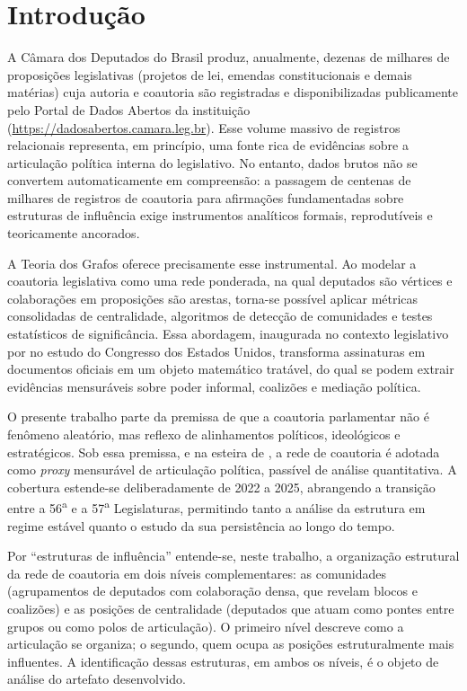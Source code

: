 \documentclass[
      12pt,
      a4paper,
      openright,
      oneside,
      chapter=TITLE,
      section=TITLE,
      english,
      french,
      spanish,
      brazilian
    ]{abntex2}
\begin{document}
    \chapter{Introdução}
    \label{cap:introducao}
    
    A Câmara dos Deputados do Brasil produz, anualmente, dezenas de milhares de proposições legislativas (projetos de lei, emendas constitucionais e demais matérias) cuja autoria e coautoria são registradas e disponibilizadas publicamente pelo Portal de Dados Abertos da instituição (\url{https://dadosabertos.camara.leg.br}). Esse volume massivo de registros relacionais representa, em princípio, uma fonte rica de evidências sobre a articulação política interna do legislativo. No entanto, dados brutos não se convertem automaticamente em compreensão: a passagem de centenas de milhares de registros de coautoria para afirmações fundamentadas sobre estruturas de influência exige instrumentos analíticos formais, reprodutíveis e teoricamente ancorados.
    
    A Teoria dos Grafos oferece precisamente esse instrumental. Ao modelar a coautoria legislativa como uma rede ponderada, na qual deputados são vértices e colaborações em proposições são arestas, torna-se possível aplicar métricas consolidadas de centralidade, algoritmos de detecção de comunidades e testes estatísticos de significância. Essa abordagem, inaugurada no contexto legislativo por  no estudo do Congresso dos Estados Unidos, transforma assinaturas em documentos oficiais em um objeto matemático tratável, do qual se podem extrair evidências mensuráveis sobre poder informal, coalizões e mediação política.
    
    O presente trabalho parte da premissa de que a coautoria parlamentar não é fenômeno aleatório, mas reflexo de alinhamentos políticos, ideológicos e estratégicos. Sob essa premissa, e na esteira de , a rede de coautoria é adotada como \textit{proxy} mensurável de articulação política, passível de análise quantitativa. A cobertura estende-se deliberadamente de 2022 a 2025, abrangendo a transição entre a 56\textsuperscript{a} e a 57\textsuperscript{a} Legislaturas, permitindo tanto a análise da estrutura em regime estável quanto o estudo da sua persistência ao longo do tempo.
    
    Por \enquote{estruturas de influência} entende-se, neste trabalho, a organização estrutural da rede de coautoria em dois níveis complementares: as comunidades (agrupamentos de deputados com colaboração densa, que revelam blocos e coalizões) e as posições de centralidade (deputados que atuam como pontes entre grupos ou como polos de articulação). O primeiro nível descreve como a articulação se organiza; o segundo, quem ocupa as posições estruturalmente mais influentes. A identificação dessas estruturas, em ambos os níveis, é o objeto de análise do artefato desenvolvido.
    
\end{document}
